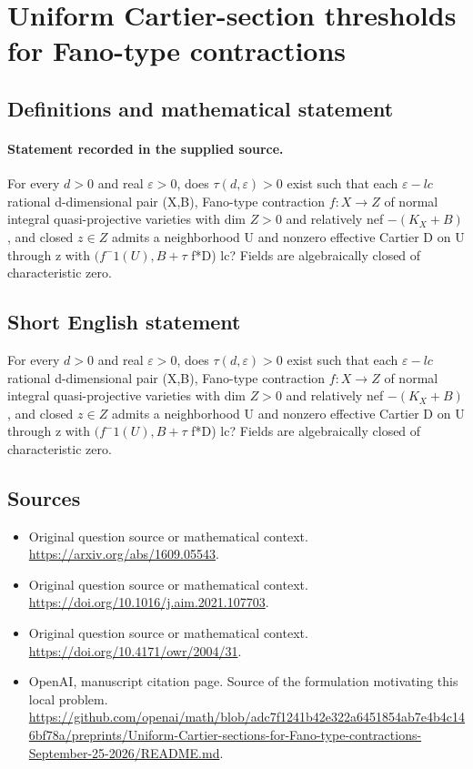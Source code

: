 \documentclass[11pt]{article}
\begin{document}
\section*{Uniform Cartier-section thresholds for Fano-type contractions}\label{30007072}
\subsection{Definitions and mathematical statement}
\paragraph{Statement recorded in the supplied source.}
For every $d>0$ and real $\varepsilon >0$, does $\tau (d,\varepsilon )>0$ exist such that each $\varepsilon -lc$ rational d-dimensional pair (X,B), Fano-type contraction $f:X\to Z$ of normal integral quasi-projective varieties with dim $Z>0$ and relatively nef $-(K_X+B)$, and closed $z\in Z$ admits a neighborhood U and nonzero effective Cartier D on U through z with $(f^-1(U),B+\tau $ f*D) lc? Fields are algebraically closed of characteristic zero.
\subsection{Short English statement}
For every $d>0$ and real $\varepsilon >0$, does $\tau (d,\varepsilon )>0$ exist such that each $\varepsilon -lc$ rational d-dimensional pair (X,B), Fano-type contraction $f:X\to Z$ of normal integral quasi-projective varieties with dim $Z>0$ and relatively nef $-(K_X+B)$, and closed $z\in Z$ admits a neighborhood U and nonzero effective Cartier D on U through z with $(f^-1(U),B+\tau $ f*D) lc? Fields are algebraically closed of characteristic zero.
\subsection{Sources}
\begin{itemize}
\item[S1] Original question source or mathematical context.
\url{https://arxiv.org/abs/1609.05543}.
\item[S2] Original question source or mathematical context.
\url{https://doi.org/10.1016/j.aim.2021.107703}.
\item[S3] Original question source or mathematical context.
\url{https://doi.org/10.4171/owr/2004/31}.
\item[S4] OpenAI, manuscript citation page. Source of the formulation motivating this local problem.
\url{https://github.com/openai/math/blob/adc7f1241b42e322a6451854ab7e4b4c146bf78a/preprints/Uniform-Cartier-sections-for-Fano-type-contractions-September-25-2026/README.md}.
\end{itemize}
\end{document}

